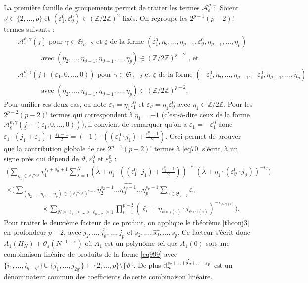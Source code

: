 \documentclass[12pt,francais, reqno]{smfart}
\numberwithin{equation}{section}
\newcommand{\dd}{\textup{d}}
\def\lam{\lambda}
\def\dd{\textup{d}}
\newcommand{\moins}{\setminus}
\newcommand{\Z}{\mathbb Z}
\newcommand{\gdo}{\mathcal{O}}
\newcommand{\sppmd}{{\mathfrak S}_{p-2}}
\newcommand{\zdzpmd}{(\Z / 2 \Z)^{p-2}}
\newcommand{\zdzd}{(\Z / 2 \Z)^2}
\newcommand{\zdz}{\Z / 2 \Z}
\newcommand{\eps}{\varepsilon}
\newcommand{\epsunz}{\eps_1^0}
\newcommand{\epstetaz}{\eps_\teta^0}
\newcommand{\gdoeps}{\gdo_\eps (N^{-1+\eps})}
\newcommand{\epssoul}{\underline{\eps}}
\newcommand{\jsoul}{\underline{j}}
\newcommand{\jtisoul}{\underline{j} + (\eps_1, 0, \ldots, 0)}
\newcommand{\deuxp}{\{2,\ldots, p\}}
\newcommand{\astgj}{{\mathcal A}_{\epssoul} ^{\teta, \gamma} (\jsoul)}
\newcommand{\astgseul}{{\mathcal A}_{\epssoul} ^{\teta, \gamma}  }
\newcommand{\astgjti}{{\mathcal A}_{\epssoul} ^{\teta, \gamma} (\jtisoul)}
\newcommand{\teta}{\vartheta}
\newcommand{\psii}{\psi}
\begin{document}
La premi\`ere famille de groupements permet de traiter les termes $\astgseul$. Soient $\teta \in \deuxp$ et $(\epsunz, \epstetaz) \in \zdzd$ fix\'es. On regroupe les $2^{p-1}(p-2)!$ termes suivants :
\begin{eqnarray*}
&& \astgj  \mbox{ pour } \gamma \in \sppmd \mbox{ et  $\epssoul$ de la forme }
(\epsunz, \eta_2, \ldots, \eta_{\teta-1}, \epstetaz, \eta_{\teta+1}, \ldots, \eta_p) \\
&& \quad \quad \quad \mbox{ avec } (\eta_2, \ldots, \eta_{\teta-1},  \eta_{\teta+1}, \ldots, \eta_p) \in \zdzpmd \mbox{ , et} \\
&&\astgjti  \mbox{ pour } \gamma \in \sppmd \mbox{ et  $\epssoul$ de la forme }
(-\epsunz, \eta_2, \ldots, \eta_{\teta-1}, -\epstetaz, \eta_{\teta+1}, \ldots, \eta_p) \\
&& \quad \quad \quad \mbox{ avec } (\eta_2, \ldots, \eta_{\teta-1},  \eta_{\teta+1}, \ldots, \eta_p) \in \zdzpmd .
\end{eqnarray*}
Pour unifier ces deux cas, on note $\eps_1 = \eta_1 \epsunz$ et $\eps_\teta = \eta_1 \epstetaz$ avec $\eta_1 \in \zdz$. 
Pour les $2^{p-2}(p-2)!$ termes qui correspondent \`a $\eta_1 = -1$ (c'est-\`a-dire ceux de la forme $\astgjti$), il convient de remarquer qu'on a $\eps_1 = - \epsunz$ donc $\eps_1 \cdot (j_1+\eps_1) + \frac{\eps_1-1}{2} = (-1) \cdot ((\epsunz \cdot j_1) + \frac{\epsunz-1}{2})$. Ceci permet de prouver  que la contribution globale de ces $2^{p-1}(p-2)!$ termes \`a \eqref{eq70} s'\'ecrit, \`a un signe pr\`es qui d\'epend de $\teta$, $\epsunz$ et $\epstetaz$ : 
\begin{multline}
\Big( \sum_{\eta_1 \in \zdz} \eta_1 ^{s_1+s_\teta+1} \sum_{\lam=1}^N 
(\lam + \eta_1 \cdot ((\epsunz \cdot j_1)+  \frac{\epsunz-1}{2}))^{-s_1}
(\lam + \eta_1 \cdot (\epstetaz \cdot j_\teta))^{-s_\teta} \Big)  \label{eq67bis} 
\\
\times \Big( \sum_{(\eta_2, \ldots, \widehat{\eta_{\teta}}, \ldots, \eta_p) \in \zdzpmd}
\eta_2 ^{s_2+1} \ldots \widehat{\eta_\teta^{s_\teta+1}} \ldots \eta_p ^{s_p+1} 
 \sum_{\gamma \in \sppmd} \eps_\gamma   
\\
 \quad \quad \quad   \quad \quad   \times  
  \sum_{N \geq \ell_1 \geq \ldots  \geq \ell_{p-2}  \geq 1}
\prod_{i=1} ^{p-2} (\ell_i+\eta_{\psii \circ \gamma (i)} \cdot j_{\psii \circ \gamma (i)})^{-s_{\psii \circ \gamma (i)}} \Big).  
\end{multline}
Pour traiter le deuxi\`eme facteur de ce produit, on applique le th\'eor\`eme \ref{thconj3} en profondeur $p-2$, avec $j_2, \ldots, \widehat{j_\teta}, \ldots, j_p$ et $s_2, \ldots, \widehat{s_\teta}, \ldots, s_p$. Ce facteur s'\'ecrit donc  $A_1(H_N) + \gdoeps$ o\`u $A_1$ est un polyn\^ome tel que $A_1(0)$ soit une combinaison lin\'eaire de produits de la forme \eqref{eq999} avec $\{ i_1 , \ldots , i_{q-q'}  \} \cup \{ j_1 , \ldots , j_{2q'} \} \subset \deuxp \moins \{\teta\}$. De plus $\dd_n^{s_2 +  \ldots + \widehat{s_\teta} + \ldots + s_p}$ est un d\'enominateur commun des coefficients de cette combinaison lin\'eaire. 
\end{document}
